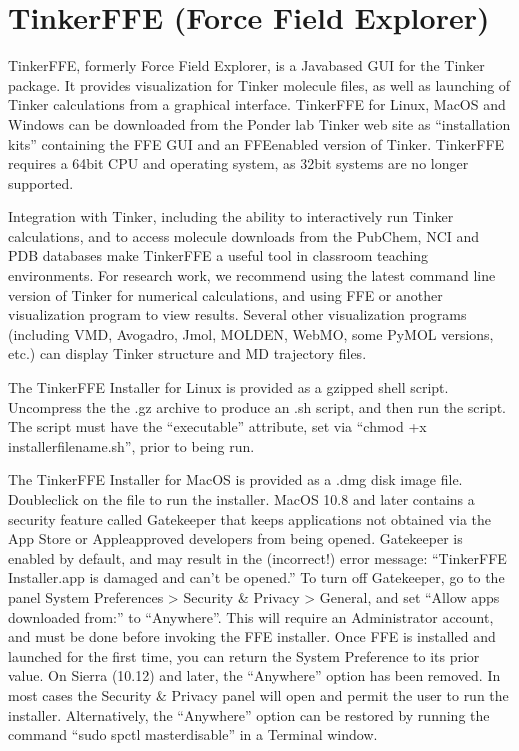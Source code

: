 \documentclass[letterpaper,11pt,english]{sphinxmanual}
\begin{document}
\section{Tinker\sphinxhyphen{}FFE (Force Field Explorer)}
\label{\detokenize{text/installation:tinker-ffe-force-field-explorer}}
\sphinxAtStartPar
Tinker\sphinxhyphen{}FFE, formerly Force Field Explorer, is a Java\sphinxhyphen{}based GUI for the Tinker package. It provides visualization for Tinker molecule files, as well as launching of Tinker calculations from a graphical interface. Tinker\sphinxhyphen{}FFE for Linux, MacOS and Windows can be downloaded from the Ponder lab Tinker web site as “installation kits” containing the FFE GUI and an FFE\sphinxhyphen{}enabled version of Tinker. Tinker\sphinxhyphen{}FFE requires a 64\sphinxhyphen{}bit CPU and operating system, as 32\sphinxhyphen{}bit systems are no longer supported.

\sphinxAtStartPar
Integration with Tinker, including the ability to interactively run Tinker calculations, and to access molecule downloads from the PubChem, NCI and PDB databases make Tinker\sphinxhyphen{}FFE a useful tool in classroom teaching environments. For research work, we recommend using the latest command line version of Tinker for numerical calculations, and using FFE or another visualization program to view results. Several other visualization programs (including VMD, Avogadro, Jmol, MOLDEN, WebMO, some PyMOL versions, etc.) can display Tinker structure and MD trajectory files.

\sphinxAtStartPar
The Tinker\sphinxhyphen{}FFE Installer for Linux is provided as a gzipped shell script. Uncompress the the .gz archive to produce an .sh script, and then run the script. The script must have the “executable” attribute, set via “chmod +x installer\sphinxhyphen{}file\sphinxhyphen{}name.sh”, prior to being run.

\sphinxAtStartPar
The Tinker\sphinxhyphen{}FFE Installer for MacOS is provided as a .dmg disk image file. Double\sphinxhyphen{}click on the file to run the installer. MacOS 10.8 and later contains a security feature called Gatekeeper that keeps applications not obtained via the App Store or Apple\sphinxhyphen{}approved developers from being opened. Gatekeeper is enabled by default, and may result in the (incorrect!) error message: “Tinker\sphinxhyphen{}FFE Installer.app is damaged and can’t be opened.” To turn off Gatekeeper, go to the panel System Preferences \textgreater{} Security \& Privacy \textgreater{} General, and set “Allow apps downloaded from:” to “Anywhere”. This will require an Administrator account, and must be done before invoking the FFE installer. Once FFE is installed and launched for the first time, you can return the System Preference to its prior value. On Sierra (10.12) and later, the “Anywhere” option has been removed. In most cases the Security \& Privacy panel will open and permit the user to run the installer. Alternatively, the “Anywhere” option can be restored by running the command “sudo spctl \textendash{}master\sphinxhyphen{}disable” in a Terminal window.
\end{document}
